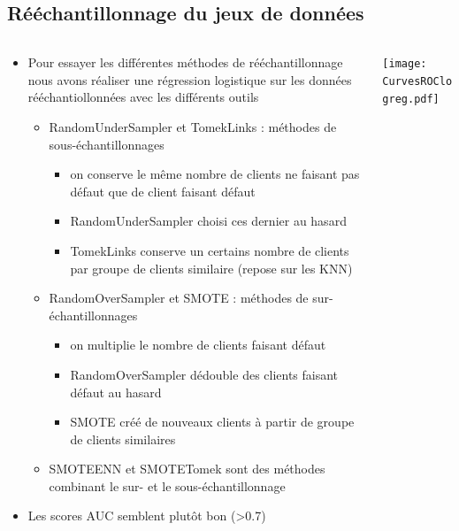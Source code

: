\documentclass[8pt,aspectratio=169,hyperref={unicode=true}]{beamer}
\begin{document}
\subsection{Rééchantillonnage du jeux de données}
\begin{frame}{\insertsection}{\insertsubsection}
    \begin{columns}
        \begin{column}{.5\textwidth}
            \begin{itemize}
                \item Pour essayer les différentes méthodes de rééchantillonnage nous avons réaliser une régression logistique sur les données rééchantiollonnées avec les différents outils
                      \begin{itemize}
                          \item RandomUnderSampler et TomekLinks : méthodes de sous-échantillonnages
                                \begin{itemize}
                                    \item on conserve le même nombre de clients ne faisant pas défaut que de client faisant défaut
                                    \item RandomUnderSampler choisi ces dernier au hasard
                                    \item TomekLinks conserve un certains nombre de clients par groupe de clients similaire (repose sur les KNN)
                                \end{itemize}
                          \item RandomOverSampler et SMOTE : méthodes de sur-échantillonnages
                                \begin{itemize}
                                    \item on multiplie le nombre de clients faisant défaut
                                    \item RandomOverSampler dédouble des clients faisant défaut au hasard
                                    \item SMOTE créé de nouveaux clients à partir de groupe de clients similaires
                                \end{itemize}
                          \item SMOTEENN et SMOTETomek sont des méthodes combinant le sur- et le sous-échantillonnage
                      \end{itemize}
                \item Les scores AUC semblent plutôt bon (\num{>0.7})
            \end{itemize}
        \end{column}
        \begin{column}{.5\textwidth}
            \texttt{[image: CurvesROClogreg.pdf]}
        \end{column}
    \end{columns}
\end{frame}
\end{document}
